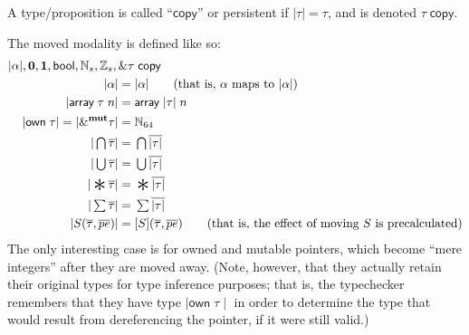 \documentclass[acmsmall,nonacm]{acmart}
\DeclareMathOperator*{\Sep}{\scalerel*{\ast}{\sum}}
\newcommand*{\N}{\mathbb{N}}
\newcommand*{\Z}{\mathbb{Z}}
\newcommand{\core}[1]{{\mid}#1{\mid}}
\begin{document}
A type/proposition is called ``$\mathsf{copy}$'' or persistent if $\core\tau=\tau$, and is denoted $\tau\;\mathsf{copy}$.

The moved modality is defined like so:
\begin{align*}
  \core\alpha,\mathbf{0}, \mathbf{1}, \mathsf{bool},\N_s, \Z_s,\&\tau&\;\mathsf{copy}\\
  \core\alpha={}&\core\alpha\qquad\mbox{(that is, $\alpha$ maps to $\core\alpha$)}\\
  \core{\mathsf{array}\;\tau\;n}={}&\mathsf{array}\;\core\tau\;n\\
  \core{\mathsf{own}\;\tau}=\core{\&^\mathbf{mut}\tau}={}&\N_{64}\\
  \core{\textstyle\bigcap\overline{\tau}}={}&\textstyle\bigcap\overline{\core\tau}\\
  \core{\textstyle\bigcup\overline{\tau}}={}&\textstyle\bigcup\overline{\core\tau}\\
  \core{\textstyle\Sep\overline{\tau}}={}&\textstyle\Sep\overline{\core\tau}\\
  \core{\textstyle\sum\overline{\tau}}={}&\textstyle\sum\overline{\core\tau}\\
  \core{S(\overline{\tau},\overline{pe})}={}&[S](\overline{\tau},\overline{pe})\qquad\mbox{(that is, the effect of moving $S$ is precalculated)}
\end{align*}
The only interesting case is for owned and mutable pointers, which become ``mere integers'' after they are moved away. (Note, however, that they actually retain their original types for type inference purposes; that is, the typechecker remembers that they have type $\core{\mathsf{own}\;\tau}$ in order to determine the type that would result from dereferencing the pointer, if it were still valid.)
\end{document}
